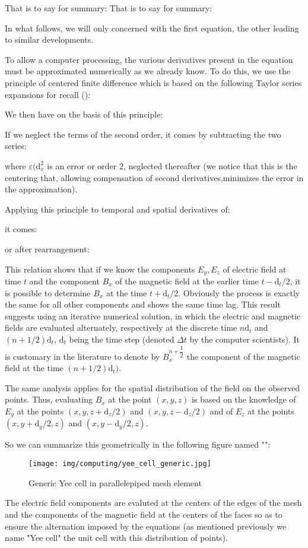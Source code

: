 	That is to say for summary:
	That is to say for summary:
	
	In what follows, we will only concerned with the first equation, the other leading to similar developments.

	To allow a computer processing, the various derivatives present in the equation must be approximated numerically as we already know. To do this, we use the principle of centered finite difference which is based on the following Taylor series expansions for recall ():
	
	We then have on the basis of this principle:
	
	If we neglect the terms of the second order, it comes by subtracting the two series:
	
	where $\varepsilon(\mathrm{d}_x^2$ is an error or order $2$, neglected thereafter (we notice that this is the centering that, allowing compensation of second derivatives,minimizes the error in the approximation).
	
	Applying this principle to temporal and spatial derivatives of:
	
	it comes:
	
	or after rearrangement:
	
	This relation shows that if we know the components $E_y,E_z$ of electric field at time $t$ and the component $B_x$ of the magnetic field at the earlier time $t-\mathrm{d}_t/2$, it is possible to determine $B_x$ at the time $t+\mathrm{d}_t/2$. Obviously the process is exactly the same for all other components and shows the same time lag. This result suggests using an iterative numerical solution, in which the electric and magnetic fields are evaluated alternately, respectively at the discrete time $n\mathrm{d}_t$ and $(n+1/2)\mathrm{d}_t$, $\mathrm{d}_t$ being the time step (denoted $\Delta t$ by the computer scientists). It is customary in the literature to denote by $B_x^{n+\dfrac{1}{2}}$ the component of the magnetic field at the time $(n+1/2)\mathrm{d}_t)$.
	
	The same analysis applies for the spatial distribution of the field on the observed points. Thus, evaluating $B_x$ at the point $(x,y,z)$ is based on the knowledge of $E_y$ at the points $(x,y,z+\mathrm{d}_z/2)$ and $(x,y,z-\mathrm{d}_z/2)$  and of $E_z$ at the points $(x,y+\mathrm{d}_y/2,z)$ and $(x,y-\mathrm{d}_y/2,z)$.

	So we can summarize this geometrically in the following figure named "":
	\begin{figure}[H]
		\centering
		\texttt{[image: img/computing/yee\_cell\_generic.jpg]}
		\caption{Generic Yee cell in parallelepiped mesh element}
	\end{figure}
	The electric field components are evaluted at the centers of the edges of the mesh and the components of the magnetic field at the centers of the faces so as to ensure the alternation imposed by the equations (as mentioned previously we name "Yee cell" the unit cell with this distribution of points).
	
